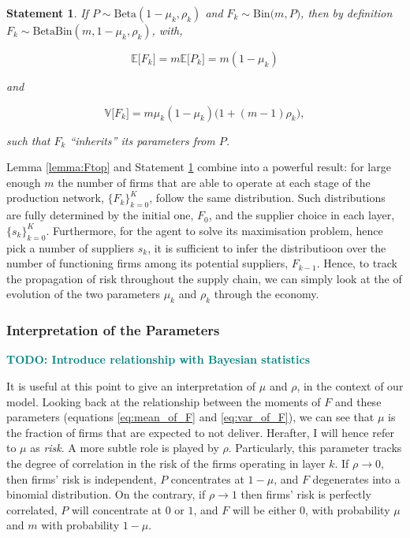 \documentclass[draft, american, abstract=on]{scrartcl}
\theoremstyle{plain}
\newtheorem{statement}{Statement}
\newcommand{\E}{\mathbb{E}}
\newcommand{\V}{\mathbb{V}}
\newcommand{\Beta}{\text{Beta}}
\newcommand{\Bin}{\text{Bin}}
\newcommand\notes[1]{\textcolor{teal}{\footnotesize \textbf{#1}}}
\begin{document}
\begin{statement} \label{statement:ptoF}
  If $P \sim \Beta(1 - \mu_k, \rho_k)$ and $F_k \sim \Bin\big(m, P \big)$, then by definition $F_k \sim \Beta\Bin(m, 1 - \mu_k, \rho_k)$, with,

  \begin{equation} \label{eq:mean_of_F}
    \E \big[F_k\big] = m \E \big[P_k\big] = m (1 - \mu_k)
  \end{equation}

  and 

  \begin{equation} \label{eq:var_of_F}
    \V \big[F_k\big] = m \mu_k (1 - \mu_k) \big(1 + (m - 1) \rho_k\big),
  \end{equation}

  such that $F_k$ ``inherits'' its parameters from $P$.
\end{statement}


Lemma \ref*{lemma:Ftop} and Statement \ref*{statement:ptoF} combine into a powerful result: for large enough $m$ the number of firms that are able to operate at each stage of the production network, $\{F_k\}^{K}_{k = 0}$, follow the same distribution. Such distributions are fully determined by the initial one, $F_0$, and the supplier choice in each layer, $\{s_k\}^{K}_{k = 0}$. Furthermore, for the agent to solve its maximisation problem, hence pick a number of suppliers $s_k$, it is sufficient to infer the distributioon over the number of functioning firms among its potential suppliers, $F_{k - 1}$. Hence, to track the propagation of risk throughout the supply chain, we can simply look at the of evolution of the two parameters $\mu_k$ and $\rho_k$ through the economy.

\subsubsection{Interpretation of the Parameters}

\notes{TODO: Introduce relationship with Bayesian statistics}

It is useful at this point to give an interpretation of $\mu$ and $\rho$, in the context of our model. Looking back at the relationship between the moments of $F$ and these parameters (equations \ref{eq:mean_of_F} and \ref{eq:var_of_F}), we can see that $\mu$ is the fraction of firms that are expected to not deliver. Herafter, I will hence refer to $\mu$ as \textit{risk}. A more subtle role is played by $\rho$. Particularly, this parameter tracks the degree of correlation in the risk of the firms operating in layer $k$. If $\rho 
\to 0$, then firms' risk is independent, $P$ concentrates at $1 - \mu$, and $F$ degenerates into a binomial distribution. On the contrary, if $\rho \rightarrow 1$ then firms' risk is perfectly correlated, $P$ will concentrate at $0$ or $1$, and $F$ will be either 0, with probability $\mu$ and $m$ with probability $1 - \mu$.
\end{document}
